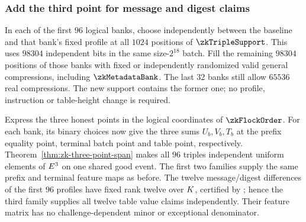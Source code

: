 \subsubsection{Add the third point for message and digest claims}

In each of the first $96$ logical banks, choose independently between the baseline and that bank's fixed profile at all $1024$ positions of $\zkTripleSupport$. This uses $98304$ independent bits in the same size-$2^{18}$ batch. Fill the remaining $98304$ positions of those banks with fixed or independently randomized valid general compressions, including $\zkMetadataBank$. The last $32$ banks still allow $65536$ real compressions. The new support contains the former one; no profile, instruction or table-height change is required.

Express the three honest points in the logical coordinates of $\zkFlockOrder$. For each bank, its binary choices now give the three sums $U_b,V_b,T_b$ at the prefix equality point, terminal batch point and table point, respectively. Theorem~\ref{thm:zk-three-point-span} makes all $96$ triples independent uniform elements of $E^3$ on one shared good event. The first two families supply the same prefix and terminal feature maps as before. The twelve message/digest differences of the first $96$ profiles have fixed rank twelve over $K$, certified by ; hence the third family supplies all twelve table value claims independently. Their feature matrix has no challenge-dependent minor or exceptional denominator.

